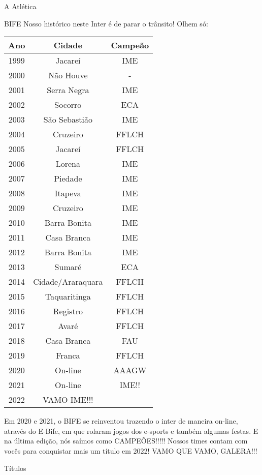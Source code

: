 \begin{secao}{A Atlética}
\begin{subsecao}{BIFE}
Nosso histórico neste Inter é de parar o trânsito! Olhem só:

\begin{center}
  \begin{tabular}{c|c|c}
   Ano & Cidade & Campeão\\
   \hline
   1999 & Jacareí & IME\\
   2000 & Não Houve & - \\
   2001 & Serra Negra & IME\\
   2002 & Socorro & ECA\\
   2003 & São Sebastião & IME\\
   2004 & Cruzeiro & FFLCH\\
   2005 & Jacareí & FFLCH\\
   2006 & Lorena & IME\\
   2007 & Piedade & IME\\
   2008 & Itapeva & IME\\
   2009 & Cruzeiro & IME\\
   2010 & Barra Bonita & IME\\
   2011 & Casa Branca & IME\\
   2012 & Barra Bonita & IME\\
   2013 & Sumaré & ECA\\
   2014 & Cidade/Araraquara & FFLCH\\
   2015 & Taquaritinga & FFLCH\\
   2016 & Registro & FFLCH\\
   2017 & Avaré & FFLCH\\
   2018 & Casa Branca & FAU\\
   2019 & Franca & FFLCH\\
   2020 & On-line & AAAGW\\
   2021 & On-line & IME!!\\
   2022 & VAMO IME!!!
  \end{tabular}
\end{center}

Em 2020 e 2021, o BIFE se reinventou trazendo o inter de maneira on-line, através do
E-Bife, em que rolaram jogos dos e-sports e também algumas festas. E na última edição,
nós saímos como CAMPEÕES!!!!! Nossos times contam com vocês para conquistar mais um
título em 2022! VAMO QUE VAMO, GALERA!!!


\end{subsecao}
\pagebreak
\begin{subsecao}{Títulos}


\end{subsecao}
\end{secao}
